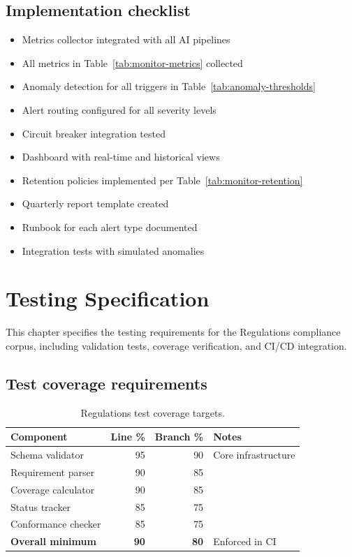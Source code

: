 \documentclass[11pt,a4paper,twoside]{report}
\begin{document}
\section{Implementation checklist}

\begin{itemize}
\item[\texttt{[ ]}] Metrics collector integrated with all AI pipelines
\item[\texttt{[ ]}] All metrics in Table~\ref{tab:monitor-metrics} collected
\item[\texttt{[ ]}] Anomaly detection for all triggers in Table~\ref{tab:anomaly-thresholds}
\item[\texttt{[ ]}] Alert routing configured for all severity levels
\item[\texttt{[ ]}] Circuit breaker integration tested
\item[\texttt{[ ]}] Dashboard with real-time and historical views
\item[\texttt{[ ]}] Retention policies implemented per Table~\ref{tab:monitor-retention}
\item[\texttt{[ ]}] Quarterly report template created
\item[\texttt{[ ]}] Runbook for each alert type documented
\item[\texttt{[ ]}] Integration tests with simulated anomalies
\end{itemize}
\chapter{Testing Specification}\label{ch:testing}

This chapter specifies the testing requirements for the Regulations compliance
corpus, including validation tests, coverage verification, and CI/CD integration.

\section{Test coverage requirements}

\begin{table}[htbp]
\centering
\caption{Regulations test coverage targets.}
\label{tab:reg-coverage}
\footnotesize
\begin{tabularx}{\linewidth}{@{}l r r X@{}}
\toprule
\textbf{Component} & \textbf{Line \%} & \textbf{Branch \%} & \textbf{Notes} \\ \midrule
Schema validator & 95 & 90 & Core infrastructure \\
Requirement parser & 90 & 85 & \\
Coverage calculator & 90 & 85 & \\
Status tracker & 85 & 75 & \\
Conformance checker & 85 & 75 & \\
\textbf{Overall minimum} & \textbf{90} & \textbf{80} & Enforced in CI \\
\bottomrule
\end{tabularx}
\end{table}
\end{document}
